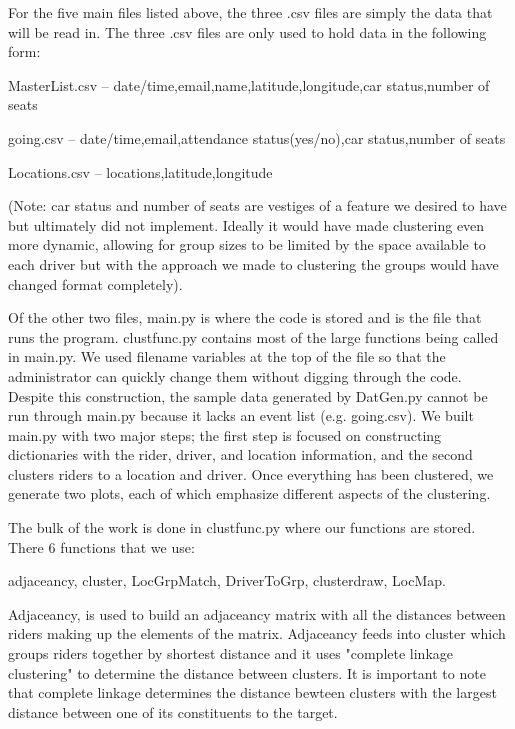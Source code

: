 \documentclass[11pt]{article}
\begin{document}
\hfill \break
For the five main files listed above, the three .csv files are simply the data that will be read
in. The three .csv files are only used to hold data in the following form:


MasterList.csv -- date/time,email,name,latitude,longitude,car status,number of seats

going.csv -- date/time,email,attendance status(yes/no),car status,number of seats

Locations.csv -- locations,latitude,longitude

\hfill \break
\noindent
(Note: car status and number of seats are vestiges of a feature we desired to have but 
ultimately did not implement. Ideally it would have made clustering even more dynamic, allowing
for group sizes to be limited by the space available to each driver but with the approach we 
made to clustering the groups would have changed format completely).

\hfill \break
Of the other two files, main.py is where the code is stored and is the file that runs the 
program. clustfunc.py contains most of the large functions being called in main.py. We used 
filename variables at the top of the file so that the administrator can quickly change them 
without digging through the code. Despite this construction, the sample data generated by 
DatGen.py cannot be run through main.py because it lacks an event list (e.g. going.csv).
\hfill \break
We built main.py with two major steps; the first step is focused on constructing dictionaries 
with the rider, driver, and location information, and the second clusters riders to a location
and driver. Once everything has been clustered, we generate two plots, each of which emphasize
different aspects of the clustering.

\hfill \break
The bulk of the work is done in clustfunc.py where our functions are stored. There 6 functions 
that we use:

\hfill \break
adjaceancy, cluster, LocGrpMatch, DriverToGrp, clusterdraw, LocMap. 

\hfill \break
Adjaceancy, is used to build an adjaceancy matrix with all the distances between riders making 
up the elements of the matrix. Adjaceancy feeds into cluster which groups riders together by 
shortest distance and it uses "complete linkage clustering" to determine the distance between 
clusters. It is important to note that complete linkage determines the distance bewteen 
clusters with the largest distance between one of its constituents to the target. 
\end{document}
